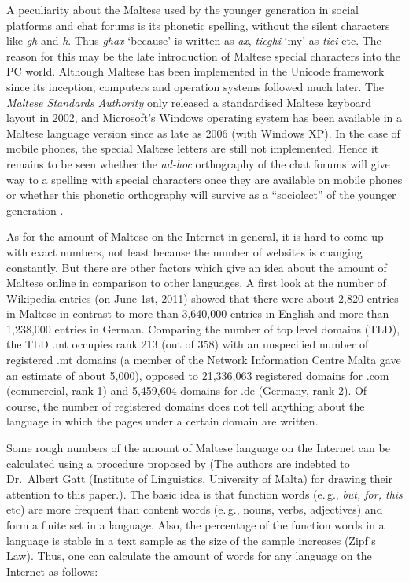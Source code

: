\begin{multicols}{2}
A peculiarity about the Maltese used by the younger generation in social platforms and chat forums is its phonetic spelling, without the silent characters like \emph{għ} and \emph{h}. Thus \emph{għax} `because' is written as \emph{ax}, \emph{tiegħi} `my' as \emph{tiei} etc. The reason for this may be the late introduction of Maltese special characters into the PC world. Although Maltese has been implemented in the Unicode framework since its inception, computers and operation systems followed much later. The \emph{Maltese Standards Authority} only released a standardised Maltese keyboard layout in 2002, and Microsoft's Windows operating system has been available in a Maltese language version since as late as 2006 (with Windows XP). In the case of mobile phones, the special Maltese letters are still not implemented. Hence it remains to be seen whether the \emph{ad-hoc} orthography of the chat forums will give way to a spelling with special characters once they are available on mobile phones or whether this phonetic orthography will survive as a ``sociolect'' of the younger generation \cite{Fabri:2011b}.

As for the amount of Maltese on the Internet in general, it is hard to come up with exact numbers, not least because the number of websites is changing constantly. But there are other factors which give an idea about the amount of Maltese online in comparison to other languages.
A first look at the number of Wikipedia entries (on June 1st, 2011) showed that there were about 2,820 entries in Maltese in contrast to more than 3,640,000 entries in English and more than 1,238,000 entries in German.
Comparing the number of top level domains (TLD), the TLD .mt occupies rank 213 (out of 358) with an unspecified number of registered .mt domains (a member of the Network Information Centre Malta gave an estimate of about 5,000), opposed to 21,336,063 registered domains for .com (commercial, rank 1) and 5,459,604 domains for .de (Germany, rank 2). Of course, the number of registered domains does not tell anything about the language in which the pages under a certain domain are written.

Some rough numbers of the amount of Maltese language on the Internet can be calculated using a procedure proposed by \cite{Kilgarriff-Grefenstette:2003} (The authors are indebted to Dr.~Albert Gatt (Institute of Linguistics, University of Malta) for drawing their attention to this paper.). The basic idea is that function words (e.\,g., \emph{but, for, this} etc) are more frequent than content words (e.\,g., nouns, verbs, adjectives) and form a finite set in a language. Also, the percentage of the function words in a language is stable in a text sample as the size of the sample increases (Zipf's Law). Thus, one can calculate the amount of words for any language on the Internet as follows: 


\end{multicols}
